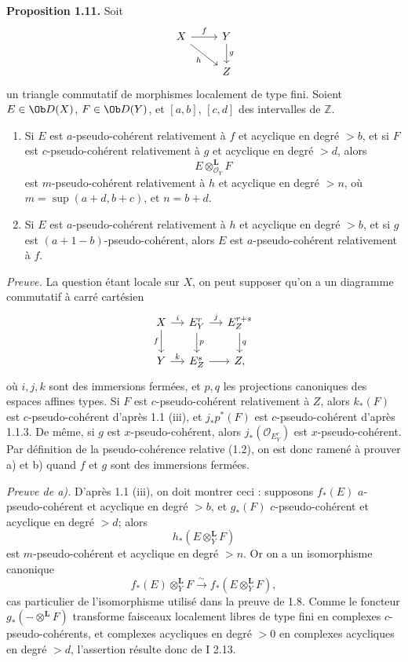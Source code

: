 \documentclass[11pt]{article}
\begin{document}
\textbf{Proposition 1.11.} Soit
\[
\begin{tikzcd}
X \arrow[r,"f"] \arrow[dr,"h"'] & Y \arrow[d,"g"]\\
& Z
\end{tikzcd}
\]
un triangle commutatif de morphismes localement de type fini. Soient \(E\in\Ob D(X)\), \(F\in\Ob D(Y)\), et \([a,b]\), \([c,d]\) des intervalles de \(\mathbb Z\).
\begin{enumerate}[label=\alph*)]
\item Si \(E\) est \(a\)-pseudo-cohérent relativement à \(f\) et acyclique en degré \(>b\), et si \(F\) est \(c\)-pseudo-cohérent relativement à \(g\) et acyclique en degré \(>d\), alors
\[
  E\otimes_{\mathcal O_Y}^{\mathbf L}F
\]
est \(m\)-pseudo-cohérent relativement à \(h\) et acyclique en degré \(>n\), où \(m=\sup(a+d,b+c)\), et \(n=b+d\).

\item Si \(E\) est \(a\)-pseudo-cohérent relativement à \(h\) et acyclique en degré \(>b\), et si \(g\) est \((a+1-b)\)-pseudo-cohérent, alors \(E\) est \(a\)-pseudo-cohérent relativement à \(f\).
\end{enumerate}

\emph{Preuve.} La question étant locale sur \(X\), on peut supposer qu'on a un diagramme commutatif à carré cartésien
\[
\begin{tikzcd}[column sep=small]
X \arrow[r,"i"] \arrow[d,"f"'] & E^r_Y \arrow[r,"j"] \arrow[d,"p"] & E^{r+s}_Z \arrow[d,"q"]\\
Y \arrow[r,"k"] & E^s_Z \arrow[r] & Z,
\end{tikzcd}
\]
où \(i,j,k\) sont des immersions fermées, et \(p,q\) les projections canoniques des espaces affines types. Si \(F\) est \(c\)-pseudo-cohérent relativement à \(Z\), alors \(k_*(F)\) est \(c\)-pseudo-cohérent d'après 1.1 (iii), et \(j_*p^*(F)\) est \(c\)-pseudo-cohérent d'après 1.1.3. De même, si \(g\) est \(x\)-pseudo-cohérent, alors \(j_*(\mathcal O_{E^r_Y})\) est \(x\)-pseudo-cohérent. Par définition de la pseudo-cohérence relative (1.2), on est donc ramené à prouver a) et b) quand \(f\) et \(g\) sont des immersions fermées.

\emph{Preuve de a).} D'après 1.1 (iii), on doit montrer ceci : supposons \(f_*(E)\) \(a\)-pseudo-cohérent et acyclique en degré \(>b\), et \(g_*(F)\) \(c\)-pseudo-cohérent et acyclique en degré \(>d\); alors
\[
  h_*(E\otimes_Y^{\mathbf L}F)
\]
est \(m\)-pseudo-cohérent et acyclique en degré \(>n\). Or on a un isomorphisme canonique
\[
  f_*(E)\otimes_Y^{\mathbf L}F\xrightarrow{\sim} f_*(E\otimes_Y^{\mathbf L}F),
\]
cas particulier de l'isomorphisme utilisé dans la preuve de 1.8. Comme le foncteur \(g_*(-\otimes^{\mathbf L}F)\) transforme faisceaux localement libres de type fini en complexes \(c\)-pseudo-cohérents, et complexes acycliques en degré \(>0\) en complexes acycliques en degré \(>d\), l'assertion résulte donc de I 2.13.
\end{document}
